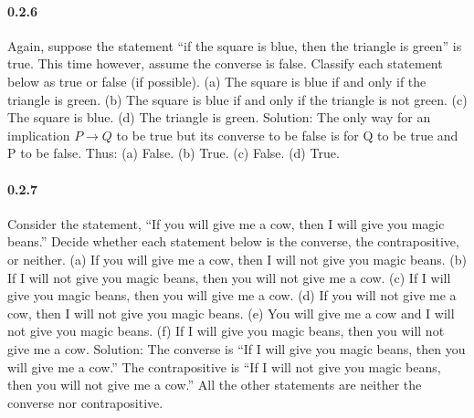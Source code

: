 \documentclass{article}
\begin{document}
\paragraph{0.2.6}
Again, suppose the statement “if the square is blue, then the triangle
is green” is true. This time however, assume the converse is false.
Classify each statement below as true or false (if possible).\newline
(a) The square is blue if and only if the triangle is green.\newline
(b) The square is blue if and only if the triangle is not green.\newline
(c) The square is blue.\newline
(d) The triangle is green.\newline
Solution:\newline
The only way for an implication $P \to Q$ to be true but its converse
to be false is for Q to be true and P to be false. Thus:\newline
(a) False.\newline
(b) True.\newline
(c) False.\newline
(d) True.
\paragraph{0.2.7}
Consider the statement, “If you will give me a cow, then I will give you
magic beans.” Decide whether each statement below is the converse,
the contrapositive, or neither.\newline
(a) If you will give me a cow, then I will not give you magic beans.\newline
(b) If I will not give you magic beans, then you will not give me a
cow.\newline
(c) If I will give you magic beans, then you will give me a cow.\newline
(d) If you will not give me a cow, then I will not give you magic
beans.\newline
(e) You will give me a cow and I will not give you magic beans.\newline
(f) If I will give you magic beans, then you will not give me a cow.\newline
Solution:\newline
The converse is “If I will give you magic beans, then you will
give me a cow.” The contrapositive is “If I will not give you magic beans,
then you will not give me a cow.” All the other statements are neither the
converse nor contrapositive.
\end{document}
